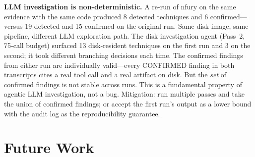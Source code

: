 \documentclass[sigconf, nonacm]{acmart}
\begin{document}
\textbf{LLM investigation is non-deterministic.} A re-run of nfury on
the same evidence with the same code produced 8 detected techniques and
6 confirmed---versus 19 detected and 15 confirmed on the original run.
Same disk image, same pipeline, different LLM exploration path.
The disk investigation agent (Pass~2, 75-call budget) surfaced
13 disk-resident techniques on the first run and 3 on the second;
it took different branching decisions each time.
The confirmed findings from either run are individually valid---every
CONFIRMED finding in both transcripts cites a real tool call and a
real artifact on disk. But the \emph{set} of confirmed findings is
not stable across runs. This is a fundamental property of agentic
LLM investigation, not a bug. Mitigation: run multiple passes and
take the union of confirmed findings; or accept the first run's output
as a lower bound with the audit log as the reproducibility guarantee.

\section{Future Work}
\end{document}

